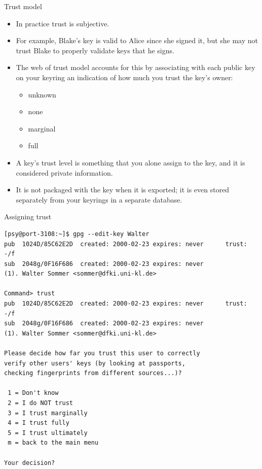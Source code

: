 \documentclass[%
mode=present,%
paper=screen%
]{powerdot}
\begin{document}
\begin{slide}{Trust model}
  \begin{itemize}
  \item In practice trust is subjective.
  \item For example, Blake's key is valid to Alice since she signed
    it, but she may not trust Blake to properly validate keys that he
    signs.
  \item The web of trust model accounts for this by associating with
    each public key on your keyring an indication of how much you
    trust the key's owner:
    \begin{itemize}
    \item unknown
    \item none
    \item marginal
    \item full
    \end{itemize}
  \item A key's trust level is something that you alone assign to the
    key, and it is considered private information.
  \item It is not packaged with the key when it is exported; it is
    even stored separately from your keyrings in a separate database.
  \end{itemize}
\end{slide}

\begin{slide}[method=direct]{Assigning trust}
\begin{verbatim}
[psy@port-3108:~]$ gpg --edit-key Walter
pub  1024D/85C62E2D  created: 2000-02-23 expires: never      trust: -/f
sub  2048g/0F16F686  created: 2000-02-23 expires: never
(1). Walter Sommer <sommer@dfki.uni-kl.de>

Command> trust
pub  1024D/85C62E2D  created: 2000-02-23 expires: never      trust: -/f
sub  2048g/0F16F686  created: 2000-02-23 expires: never
(1). Walter Sommer <sommer@dfki.uni-kl.de>

Please decide how far you trust this user to correctly
verify other users' keys (by looking at passports,
checking fingerprints from different sources...)?

 1 = Don't know
 2 = I do NOT trust
 3 = I trust marginally
 4 = I trust fully
 5 = I trust ultimately
 m = back to the main menu

Your decision?  
\end{verbatim}%
\end{slide}
\end{document}
